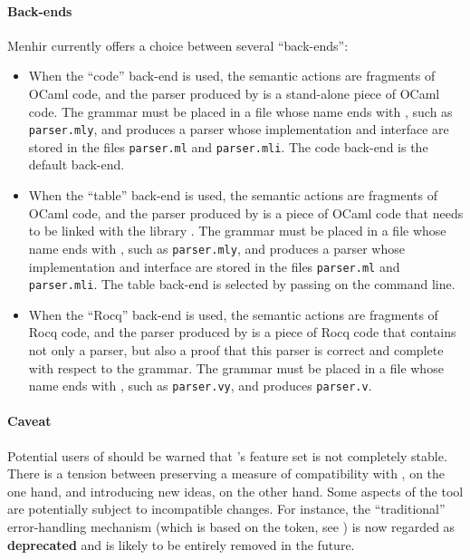 \documentclass[onecolumn,11pt,nocopyrightspace,preprint]{sigplanconf}
\begin{document}
\paragraph*{Back-ends}
Menhir currently offers a choice between several ``back-ends'':
\begin{itemize}
\item When the ``code'' back-end is used,
      the semantic actions are fragments of OCaml code,
      and the parser produced by \menhir is a stand-alone piece of OCaml code.
      The grammar must be placed in a file whose name ends with \mly,
      such as \texttt{parser.mly}, and \menhir produces
      a parser whose implementation and interface are stored in the files
      \texttt{parser.ml} and \texttt{parser.mli}.
      The code back-end is the default back-end.
\item When the ``table'' back-end is used,
      the semantic actions are fragments of OCaml code,
      and the parser produced by \menhir is a piece of OCaml code
      that needs to be linked with the library \menhirlib.
      The grammar must be placed in a file whose name ends with \mly,
      such as \texttt{parser.mly}, and \menhir produces
      a parser whose implementation and interface are stored in the files
      \texttt{parser.ml} and \texttt{parser.mli}.
      The table back-end is selected by passing \otable on the command line.
\item When the ``Rocq'' back-end is used,
      the semantic actions are fragments of Rocq code,
      and the parser produced by \menhir is a piece of Rocq code
      that contains not only a parser,
      but also a proof that this parser is correct and complete
      with respect to the grammar.
      The grammar must be placed in a file whose name ends with \vy,
      such as \texttt{parser.vy}, and \menhir produces
      \texttt{parser.v}.
\end{itemize}

\paragraph*{Caveat}

Potential users of \menhir should be warned that \menhir's feature set is not
completely stable. There is a tension between preserving a measure of
compatibility with \ocamlyacc, on the one hand, and introducing new ideas, on
the other hand. Some aspects of the tool are potentially subject to
incompatible changes. For instance, the ``traditional'' error-handling
mechanism (which is based on the \error token, see ) is now
regarded as \textbf{deprecated} and is likely to be entirely removed in the
future.
\end{document}
